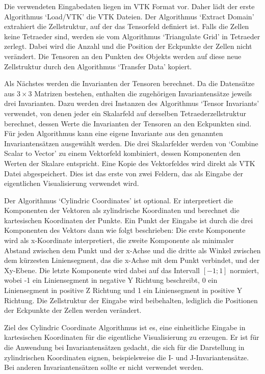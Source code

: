 \documentclass[a4paper,fontsize=12pt,toc=bib,halfparskip]{scrartcl}
\begin{document}
Die verwendeten Eingabedaten liegen im VTK Format\cite{avila2010vtk} vor. Daher l\"adt der erste Algorithmus `Load/VTK' die VTK Dateien. Der Algorithmus `Extract Domain' extrahiert die Zellstruktur, auf der das Tensorfeld definiert ist. Falls die Zellen keine Tetraeder sind, werden sie vom Algorithmus `Triangulate Grid' in Tetraeder zerlegt. Dabei wird die Anzahl und die Position der Eckpunkte der Zellen nicht ver\"andert. Die Tensoren an den Punkten des Objekts werden auf diese neue Zellstruktur durch den Algorithmus `Transfer Data' kopiert. 

Als N\"achstes werden die Invarianten der Tensoren berechnet. Da die Datens\"atze aus $3\times3$ Matrizen bestehen, enthalten die zugeh\"origen Invariantens\"atze jeweils drei Invarianten. Dazu werden drei Instanzen des Algorithmus `Tensor Invariants' verwendet, von denen jeder ein Skalarfeld auf derselben Tetraederzellstruktur berechnet, dessen Werte die Invarianten der Tensoren an den Eckpunkten sind. F\"ur jeden Algorithmus kann eine eigene Invariante aus den genannten Invariantens\"atzen ausgew\"ahlt werden. Die drei Skalarfelder werden von `Combine Scalar to Vector' zu einem Vektorfeld kombiniert, dessen Komponenten den Werten der Skalare entspricht. Eine Kopie des Vektorfeldes wird direkt als VTK Datei abgespeichert. Dies ist das erste von zwei Feldern, das als Eingabe der eigentlichen Visualisierung verwendet wird.

Der Algorithmus `Cylindric Coordinates' ist optional. Er interpretiert die Komponenten der Vektoren als zylindrische Koordinaten und berechnet die kartesischen Koordinaten der Punkte. Ein Punkt der Eingabe ist durch die drei Komponenten des Vektors dann wie folgt beschrieben: Die erste Komponente wird als x-Koordinate interpretiert, die zweite Komponente als minimaler Abstand zwischen dem Punkt und der x-Achse und die dritte als Winkel zwischen dem k\"urzesten Liniensegment, das die x-Achse mit dem Punkt verbindet, und der Xy-Ebene. Die letzte Komponente wird dabei auf das Intervall $[-1;1]$ normiert, wobei -1 ein Liniensegment in negative Y Richtung beschreibt, 0 ein Liniensegment in positive Z Richtung und 1 ein Liniensegment in positive Y Richtung. Die Zellstruktur der Eingabe wird beibehalten, lediglich die Positionen der Eckpunkte der Zellen werden ver\"andert.

Ziel des Cylindric Coordinate Algorithmus ist es, eine einheitliche Eingabe in kartesischen Koordinaten f\"ur die eigentliche Visualisierung zu erzeugen. Er ist f\"ur die Anwendung bei Invariantens\"atzen gedacht, die sich f\"ur die Darstellung in zylindrischen Koordinaten eignen, beispielsweise die I- und J-Invariantens\"atze. Bei anderen Invariantens\"atzen sollte er nicht verwendet werden.
\end{document}
